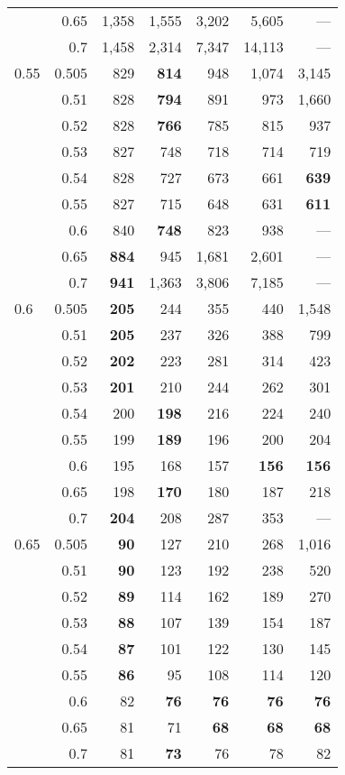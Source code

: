 \documentclass[12pt,runningheads]{llncs}
\begin{document}
{\begin{table}
\begin{tabular}{lr|rrrr|r}
     & 0.65 & 1,358 & 1,555 & 3,202 & 5,605  & --- \\
     & 0.7 & 1,458 & 2,314 & 7,347 & 14,113  & --- \\
\hline
0.55 & 0.505 & 829 & \bf{814} & 948 & 1,074  & 3,145 \\
     & 0.51 & 828 & \bf{794} & 891 & 973  & 1,660 \\
     & 0.52 & 828 & \bf{766} & 785 & 815  & 937 \\
     & 0.53 & 827 & 748 & 718 & 714  & 719 \\
     & 0.54 & 828 & 727 & 673 & 661  & \bf{639} \\
     & 0.55 & 827 & 715 & 648 & 631  & \bf{611} \\
     & 0.6 & 840 & \bf{748} & 823 & 938  & --- \\
     & 0.65 & \bf{884} & 945 & 1,681 & 2,601  & --- \\
     & 0.7 & \bf{941} & 1,363 & 3,806 & 7,185  & --- \\
\hline
0.6 & 0.505 & \bf{205} & 244 & 355 & 440  & 1,548 \\
     & 0.51 & \bf{205} & 237 & 326 & 388  & 799 \\
     & 0.52 &\bf{202} & 223 & 281 & 314  & 423 \\
     & 0.53 & \bf{201} & 210 & 244 & 262  & 301 \\
     & 0.54 & 200 & \bf{198} & 216 & 224  & 240 \\
     & 0.55 & 199 & \bf{189} & 196 & 200  & 204 \\
     & 0.6 & 195 & 168 & 157 & \bf{156}  & \bf{156} \\
     & 0.65 & 198 & \bf{170} & 180 & 187  & 218 \\
     & 0.7 & \bf{204} & 208 & 287 & 353  & --- \\
\hline
0.65 & 0.505 & \bf{90} & 127 & 210 & 268  & 1,016 \\
     & 0.51 & \bf{90} & 123 & 192 & 238  & 520 \\
     & 0.52 & \bf{89} & 114 & 162 & 189  & 270 \\
     & 0.53 & \bf{88} & 107 & 139 & 154  & 187 \\
     & 0.54 & \bf{87} & 101 & 122 & 130  & 145 \\
     & 0.55 & \bf{86} & 95 & 108 & 114  & 120 \\
     & 0.6 & 82 & \bf{76} & \bf{76} & \bf{76}  & \bf{76} \\
     & 0.65 & 81 & 71 & \bf{68} & \bf{68}  & \bf{68} \\
     & 0.7 & 81 & \bf{73} & 76 & 78  & 82 \\

\end{tabular}
\end{table}}
\end{document}
